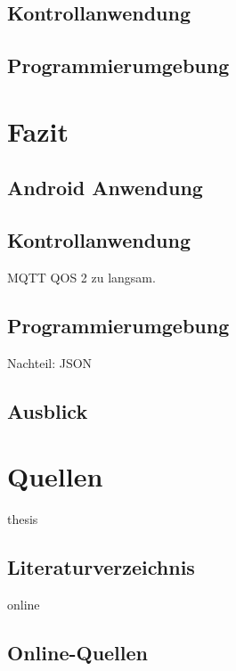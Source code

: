 \documentclass[11pt,a4paper]{report}
\begin{document}
\section{Kontrollanwendung}
\blindtext

\section{Programmierumgebung}
\blindtext

\chapter{Fazit}\label{chap:fazit}
\section{Android Anwendung}

\section{Kontrollanwendung}
MQTT QOS 2 zu langsam.
\blindtext

\section{Programmierumgebung}
Nachteil: JSON
\blindtext

\section{Ausblick}
\blindtext

\chapter{Quellen}\label{chap:source}



\begin{btSect}{thesis} %
\section*{Literaturverzeichnis}
\btPrintCited
\end{btSect}
\begin{btSect}{online}
\section*{Online-Quellen}
\btPrintCited
%
\end{btSect}
\end{document}
